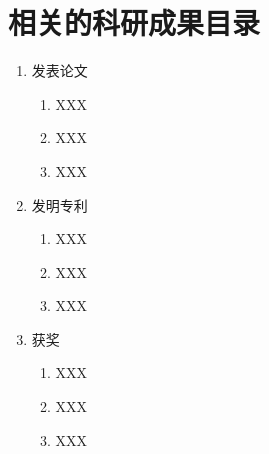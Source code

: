 \chapter{相关的科研成果目录}

\begin{enumerate}
	\item 发表论文
	\begin{enumerate}
		\item XXX
		\item XXX
		\item XXX
	\end{enumerate}
	\item 发明专利
	\begin{enumerate}
		\item XXX
		\item XXX
		\item XXX
	\end{enumerate}
	\item 获奖
	\begin{enumerate}
		\item XXX
		\item XXX
		\item XXX
	\end{enumerate}
	
\end{enumerate}